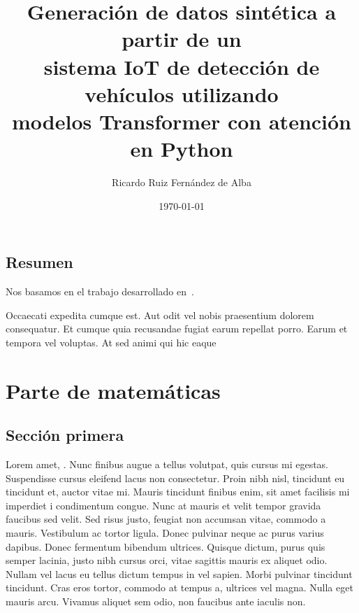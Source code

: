 \documentclass[oneside,openright,titlepage,numbers=noenddot,openany,headinclude,footinclude=true,
cleardoublepage=empty,abstractoff,BCOR=5mm,paper=a4,fontsize=12pt,main=spanish]{scrreprt}
\author{Ricardo Ruiz Fernández de Alba}
\date{\today}
\title{Generación de datos sintética a partir de un \\  sistema IoT de detección
de vehículos utilizando \\ modelos Transformer con atención en Python}
\begin{document}
\maketitle
\tableofcontents


\chapter*{Resumen}


Nos basamos en el trabajo desarrollado en~\cite{vaswani_attention_2017}.

Occaecati expedita cumque est. Aut odit vel nobis praesentium dolorem
consequatur. Et cumque quia recusandae fugiat earum repellat
porro. Earum et tempora vel voluptas. At sed animi qui hic eaque



\part{Parte de matemáticas}

\chapter{Sección primera}

Lorem amet, . Nunc finibus
augue a tellus volutpat, quis cursus mi egestas. Suspendisse cursus
eleifend lacus non consectetur. Proin nibh nisl, tincidunt eu
tincidunt et, auctor vitae mi. Mauris tincidunt finibus enim, sit amet
facilisis mi imperdiet i
condimentum congue. Nunc at mauris et velit tempor gravida faucibus
sed velit. Sed risus justo, feugiat non accumsan vitae, commodo a
mauris. Vestibulum ac tortor ligula. Donec pulvinar neque ac purus
varius dapibus. Donec fermentum bibendum ultrices. Quisque dictum,
purus quis semper lacinia, justo nibh cursus orci, vitae sagittis
mauris ex aliquet odio. Nullam vel lacus eu tellus dictum tempus in
vel sapien. Morbi pulvinar tincidunt tincidunt. Cras eros tortor,
commodo at tempus a, ultrices vel magna. Nulla eget mauris
arcu. Vivamus aliquet sem odio, non faucibus ante iaculis non.
\end{document}
